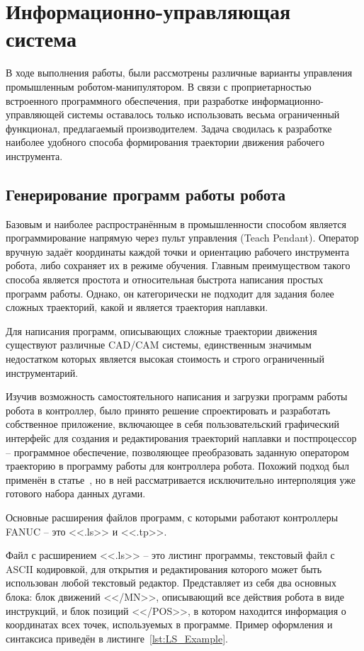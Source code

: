 \chapter{Информационно-управляющая система}
В ходе выполнения работы, были рассмотрены различные варианты управления промышленным роботом-манипулятором.
В связи с проприетарностью встроенного программного обеспечения, при разработке информационно-управляющей системы оставалось только использовать весьма ограниченный функционал, предлагаемый производителем.
Задача сводилась к разработке наиболее удобного способа формирования траектории движения рабочего инструмента.


\section{Генерирование программ работы робота}
Базовым и наиболее распространённым в промышленности способом является программирование напрямую через пульт управления (Teach Pendant).
Оператор вручную задаёт координаты каждой точки и ориентацию рабочего инструмента робота, либо сохраняет их в режиме обучения.
Главным преимуществом такого способа является простота и относительная быстрота написания простых программ работы.
Однако, он категорически не подходит для задания более сложных траекторий, какой и является траектория наплавки.

Для написания программ, описывающих сложные траектории движения существуют различные CAD/CAM системы, единственным значимым недостатком которых является высокая стоимость и строго ограниченный инструментарий.

Изучив возможность самостоятельного написания и загрузки программ работы робота в контроллер, было принято решение спроектировать и разработать собственное приложение, включающее в себя пользовательский графический интерфейс для создания и редактирования траекторий наплавки и постпроцессор -- программное обеспечение, позволяющее преобразовать заданную оператором траекторию в программу работы для контроллера робота.
Похожий подход был применён в статье~\cite{Nagata_2017}, но в ней рассматривается исключительно интерполяция уже готового набора данных дугами.

Основные расширения файлов программ, с которыми работают контроллеры FANUC -- это <<.ls>> и <<.tp>>.

Файл с расширением <<.ls>> -- это листинг программы, текстовый файл с ASCII кодировкой, для открытия и редактирования которого может быть использован любой текстовый редактор.
Представляет из себя два основных блока: блок движений <</MN>>, описывающий все действия робота в виде инструкций, и блок позиций <</POS>>, в котором находится информация о координатах всех точек, используемых в программе.
Пример оформления и синтаксиса приведён в листинге~\ref{lst:LS_Example}.

